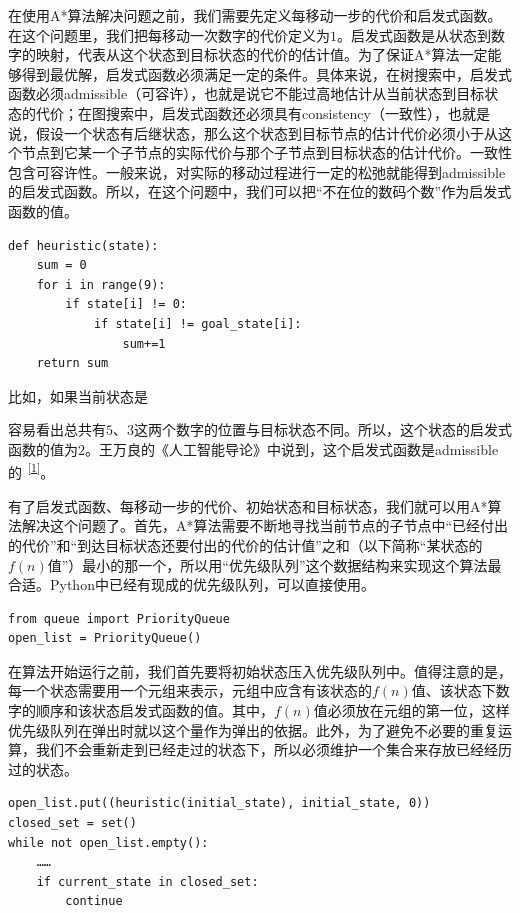 \documentclass{article}
\begin{document}
在使用A*算法解决问题之前，我们需要先定义每移动一步的代价和启发式函数。在这个问题里，我们把每移动一次数字的代价定义为$1$。启发式函数是从状态到数字的映射，代表从这个状态到目标状态的代价的估计值。为了保证A*算法一定能够得到最优解，启发式函数必须满足一定的条件。具体来说，在树搜索中，启发式函数必须admissible（可容许），也就是说它不能过高地估计从当前状态到目标状态的代价；在图搜索中，启发式函数还必须具有consistency（一致性），也就是说，假设一个状态有后继状态，那么这个状态到目标节点的估计代价必须小于从这个节点到它某一个子节点的实际代价与那个子节点到目标状态的估计代价。一致性包含可容许性。一般来说，对实际的移动过程进行一定的松弛就能得到admissible的启发式函数。所以，在这个问题中，我们可以把“不在位的数码个数”作为启发式函数的值。
\begin{lstlisting}
def heuristic(state):
    sum = 0
    for i in range(9):
        if state[i] != 0:
            if state[i] != goal_state[i]:
                sum+=1
    return sum
\end{lstlisting}
比如，如果当前状态是
\begin{center}
\end{center}
容易看出总共有$5$、$3$这两个数字的位置与目标状态不同。所以，这个状态的启发式函数的值为$2$。王万良的《人工智能导论》中说到，这个启发式函数是admissible的\textsuperscript{~\hyperref[ref1]{[1]}}。

有了启发式函数、每移动一步的代价、初始状态和目标状态，我们就可以用A*算法解决这个问题了。首先，A*算法需要不断地寻找当前节点的子节点中“已经付出的代价”和“到达目标状态还要付出的代价的估计值”之和（以下简称“某状态的$f(n)$值”）最小的那一个，所以用“优先级队列”这个数据结构来实现这个算法最合适。Python中已经有现成的优先级队列，可以直接使用。
\begin{lstlisting}
from queue import PriorityQueue
open_list = PriorityQueue()
\end{lstlisting}

在算法开始运行之前，我们首先要将初始状态压入优先级队列中。值得注意的是，每一个状态需要用一个元组来表示，元组中应含有该状态的$f(n)$值、该状态下数字的顺序和该状态启发式函数的值。其中，$f(n)$值必须放在元组的第一位，这样优先级队列在弹出时就以这个量作为弹出的依据。此外，为了避免不必要的重复运算，我们不会重新走到已经走过的状态下，所以必须维护一个集合来存放已经经历过的状态。
\begin{lstlisting}
open_list.put((heuristic(initial_state), initial_state, 0))
closed_set = set()
while not open_list.empty():
    ……
    if current_state in closed_set:
        continue
\end{lstlisting}
\end{document}
